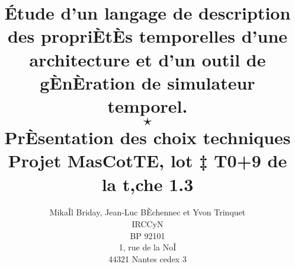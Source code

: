 \documentclass[11pt]{article}
\title{
\LARGE{\'Etude d'un langage de description des propriÈtÈs temporelles d'une architecture et d'un outil de gÈnÈration de simulateur temporel.}\\\LARGE{$\star$}\\
\Large{PrÈsentation des choix techniques}
\\
\large{Projet MasCotTE, lot ‡ T0+9 de la t‚che 1.3}
}
\author{MikaÎl Briday, Jean-Luc BÈchennec et Yvon Trinquet \\ IRCCyN \\ BP 92101 \\ 1, rue de la NoÎ \\ 44321 Nantes cedex 3}
\date{}                                           %
\begin{document}
\maketitle
~
\newpage
~
\newpage
\tableofcontents








\end{document}
